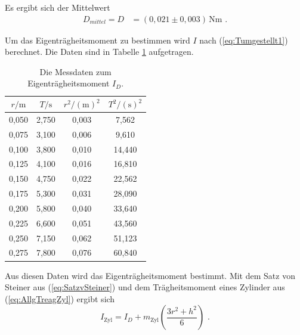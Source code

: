 Es ergibt sich der Mittelwert
\begin{align*}
  D_{mittel} = D  & = (0,021 \pm 0,003) \, \unit{\newton\meter} \text{ .}
\end{align*}

Um das Eigenträgheitsmoment zu bestimmen wird $I$ nach (\ref{eq:Tumgestellt1}) berechnet.
Die Daten sind in Tabelle \ref{tab:Eigenträgheitsmoment} aufgetragen.

\begin{table}
  \centering
  \caption{Die Messdaten zum Eigenträgheitsmoment $I_{D}$.}
  \label{tab:Eigenträgheitsmoment}
  \begin{tabular}{c c c c}
    \toprule
    $r / \unit\meter$  &  $T / \unit\second$ & $r^2 / (\unit\meter)^2$  & $T^2 / (\unit\second)^2$\\
    \midrule
      0,050   & 2,750   & 0,003   &  7,562  \\
      0,075   & 3,100   & 0,006   &  9,610  \\
      0,100   & 3,800   & 0,010   & 14,440  \\
      0,125   & 4,100   & 0,016   & 16,810  \\
      0,150   & 4,750   & 0,022   & 22,562  \\
      0,175   & 5,300   & 0,031   & 28,090  \\
      0,200   & 5,800   & 0,040   & 33,640  \\
      0,225   & 6,600   & 0,051   & 43,560  \\
      0,250   & 7,150   & 0,062   & 51,123  \\
      0,275   & 7,800   & 0,076   & 60,840  \\
    \bottomrule
    \end{tabular}
\end{table}

Aus diesen Daten wird das Eigenträgheitsmoment bestimmt.
Mit dem Satz von Steiner aus (\ref{eq:SatzvSteiner}) und dem Trägheitsmoment eines Zylinder aus (\ref{eq:AllgTreagZyl}) ergibt sich
\begin{equation} \label{eq:IZyl}
  I_{\text{Zyl}} = I_{D} + m_{\text{Zyl}}  \left( \frac{3 r^2 + h^2}{6} \right) \text{ .}
\end{equation}

